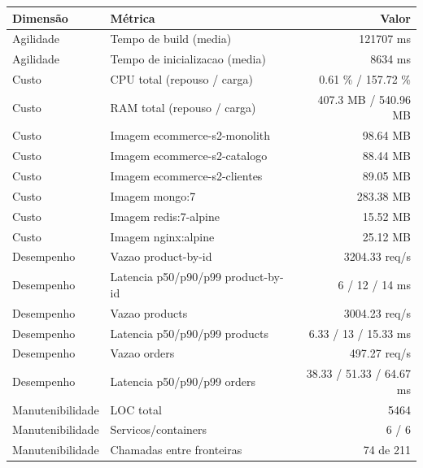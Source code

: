 \begin{quadro}[htb]
  \centering
  \caption{Métricas (ecommerce, capacidade-negocio, snapshot-2).}
  \label{qua:metricas-ecommerce-capacidade-negocio-snapshot-2}
  \renewcommand{\arraystretch}{1.15}
  \begin{tabular}{|l|l|r|}
    \hline
    \textbf{Dimensão} & \textbf{Métrica} & \textbf{Valor} \\
    \hline
    Agilidade & Tempo de build (media) & 121707 ms \\ \hline
    Agilidade & Tempo de inicializacao (media) & 8634 ms \\ \hline
    Custo & CPU total (repouso / carga) & 0.61 \% / 157.72 \% \\ \hline
    Custo & RAM total (repouso / carga) & 407.3 MB / 540.96 MB \\ \hline
    Custo & Imagem ecommerce-s2-monolith & 98.64 MB \\ \hline
    Custo & Imagem ecommerce-s2-catalogo & 88.44 MB \\ \hline
    Custo & Imagem ecommerce-s2-clientes & 89.05 MB \\ \hline
    Custo & Imagem mongo:7 & 283.38 MB \\ \hline
    Custo & Imagem redis:7-alpine & 15.52 MB \\ \hline
    Custo & Imagem nginx:alpine & 25.12 MB \\ \hline
    Desempenho & Vazao product-by-id & 3204.33 req/s \\ \hline
    Desempenho & Latencia p50/p90/p99 product-by-id & 6 / 12 / 14 ms \\ \hline
    Desempenho & Vazao products & 3004.23 req/s \\ \hline
    Desempenho & Latencia p50/p90/p99 products & 6.33 / 13 / 15.33 ms \\ \hline
    Desempenho & Vazao orders & 497.27 req/s \\ \hline
    Desempenho & Latencia p50/p90/p99 orders & 38.33 / 51.33 / 64.67 ms \\ \hline
    Manutenibilidade & LOC total & 5464 \\ \hline
    Manutenibilidade & Servicos/containers & 6 / 6 \\ \hline
    Manutenibilidade & Chamadas entre fronteiras & 74 de 211 \\ \hline
  \end{tabular}
\end{quadro}
